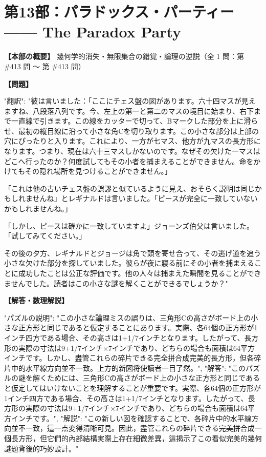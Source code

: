 \documentclass[10pt,a4paper,oneside,openany]{ltjsbook}
\begin{document}
\chapter*{第13部：パラドックス・パーティー —— The Paradox Party}

\textbf{【本部の概要】} 幾何学的消失・無限集合の錯覚・論理の逆説（全 1 問：第 \#413 問 〜 第 \#413 問）

\vspace{1em}

\begin{tcolorbox}[colback=softblue,colframe=primaryblue,title=\textbf{第 413 問：A CHESSBOARD FALLACY.},arc=2mm,boxrule=1pt,breakable]
\textbf{【問題】}\par\vspace{0.3em}
{
  "翻訳": "彼は言いました：「ここにチェス盤の図があります。六十四マスが見えますね、八段落八列です。今、左上の第一と第二のマスの境目に始まり、右下まで一直線で引きます。この線をカッターで切って、Bマークした部分を上に滑らせ、最初の縦目線に沿って小さな角Cを切り取ります。この小さな部分は上部の穴にぴったりと入ります。これにより、一方が七マス、他方が九マスの長方形になります。つまり、現在は六十三マスしかないのです。なぜその欠けた一マスはどこへ行ったのか？何度試してもその小者を捕まえることができません。命をかけてもその隠れ場所を見つけることができません。」

「これは他の古いチェス盤の誤謬と似ているように見え、おそらく説明は同じかもしれませんね」とレギナルドは言いました。「ピースが完全に一致していないかもしれませんね。」

「しかし、ピースは確かに一致していますよ」ジョーンズ伯父は言いました。「試してみてください。」

その後の夕方、レギナルドとジョージは角で頭を寄せ合って、その逃げ道を追う小さな欠けた部分を探していました。彼らが夜に寢る前にその小者を捕まえることに成功したことは公正な評価です。他の人々は捕まえた瞬間を見ることができませんでした。読者はこの小さな謎を解くことができるでしょうか？"
}
\tcblower
\textbf{【解答・数理解説】}\par\vspace{0.3em}
{
"パズルの説明": "この小さな論理ミスの誤りは、三角形Cの高さがボード上の小さな正方形と同じであると仮定することにあります。実際、各64個の正方形が1インチ四方である場合、その高さは1+1/7インチとなります。したがって、長方形の実際の寸法は9+1/7インチ×7インチであり、どちらの場合も面積は64平方インチです。しかし、盡管これらの碎片できる完全拼合成完美的長方形，但各碎片中的水平線方向並不一致。上方的新図将使讀者一目了然。",
"解答": "このパズルの謎を解くためには、三角形Cの高さがボード上の小さな正方形と同じであると仮定してはいけないことを理解することが重要です。実際、各64個の正方形が1インチ四方である場合、その高さは1+1/7インチとなります。したがって、長方形の実際の寸法は9+1/7インチ×7インチであり、どちらの場合も面積は64平方インチです。",
"解説": "この新しい図を確認することで、各碎片中的水平線方向並不一致，這一点変得清晰可見。因此，盡管これらの碎片できる完美拼合成一個長方形，但它們的內部結構実際上存在細微差異，這揭示了この看似完美的幾何謎題背後的巧妙設計。"
}
\end{tcolorbox}
\end{document}
